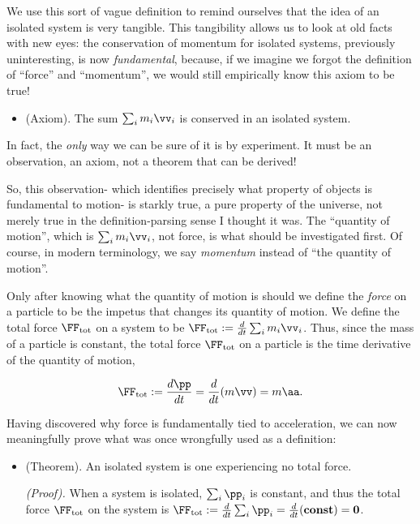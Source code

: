 \documentclass{article}
\begin{document}
We use this sort of vague definition to remind ourselves that the idea of an isolated system is very tangible. This tangibility allows us to look at old facts with new eyes: the conservation of momentum for isolated systems, previously uninteresting, is now \textit{fundamental}, because, if we imagine we forgot the definition of ``force'' and ``momentum'', we would still empirically know this axiom to be true!

\begin{itemize}
    \item (Axiom). The sum $\sum_i m_i \vv_i$ is conserved in an isolated system.
\end{itemize}

In fact, the \textit{only} way we can be sure of it is by experiment. It must be an observation, an axiom, not a theorem that can be derived!

So, this observation- which identifies precisely what property of objects is fundamental to motion- is starkly true, a pure property of the universe, not merely true in the definition-parsing sense I thought it was. The ``quantity of motion'', which is $\sum_i m_i \vv_i$, not force, is what should be investigated first. Of course, in modern terminology, we say \textit{momentum} instead of ``the quantity of motion''.

Only after knowing what the quantity of motion is should we define the \textit{force} on a particle to be the impetus that changes its quantity of motion. We define the total force $\FF_{\text{tot}}$ on a system to be $\FF_{\text{tot}} := \frac{d}{dt} \sum_i m_i \vv_i$. Thus, since the mass of a particle is constant, the total force $\FF_{\text{tot}}$ on a particle is the time derivative of the quantity of motion,

\begin{align*}
    \FF_{\text{tot}} := \frac{d\pp}{dt} = \frac{d}{dt}(m\vv) = m\aa.
\end{align*}

Having discovered why force is fundamentally tied to acceleration, we can now meaningfully prove what was once wrongfully used as a definition:

\begin{itemize}
    \item (Theorem). An isolated system is one experiencing no total force.
    
    \indent \textit{(Proof).} When a system is isolated, $\sum_i \pp_i$ is constant, and thus the total force $\FF_{\text{tot}}$ on the system is $\FF_{\text{tot}} := \frac{d}{dt}\sum_i \pp_i = \frac{d}{dt}(\textbf{const}) = \mathbf{0}$.
\end{itemize}
\end{document}
